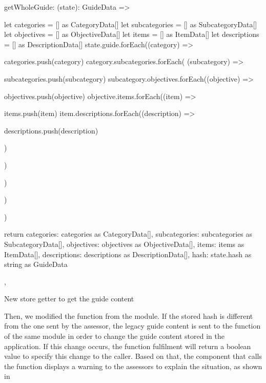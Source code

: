 \begin{listing}[!ht] 
	\begin{javascriptcode}
		getWholeGuide: (state): GuideData => {
			let categories = [] as CategoryData[]
			let subcategories = [] as SubcategoryData[]
			let objectives = [] as ObjectiveData[]
			let items = [] as ItemData[]
			let descriptions = [] as DescriptionData[]
			state.guide.forEach((category) => {

				categories.push(category)
				category.subcategories.forEach( (subcategory) => {

					subcategories.push(subcategory)
					subcategory.objectives.forEach((objective) => {

						objectives.push(objective)
						objective.items.forEach((item) => {

							items.push(item)
							item.descriptions.forEach((description) => {

								descriptions.push(description)
							})
						})
					})
				})
			})

			return {
				categories: categories as CategoryData[],
				subcategories: subcategories as SubcategoryData[],
				objectives: objectives as ObjectiveData[],
				items: items as ItemData[],
				descriptions: descriptions as DescriptionData[],
				hash: state.hash as string
			} as GuideData
		},
	\end{javascriptcode}
	\caption{New store getter to get the guide content}
	\label{lst:app_implementation_improvement_store}
\end{listing}

Then, we modified the  function from the  module. If the stored hash is different from the one sent by the assessor, the legacy guide content is sent to the  function of the same module in order to change the guide content stored in the application. If this change occurs, the function fulfilment will return a boolean  value to specify this change to the caller. Based on that, the  component that calls the  function displays a warning to the assessors to explain the situation, as shown in 


